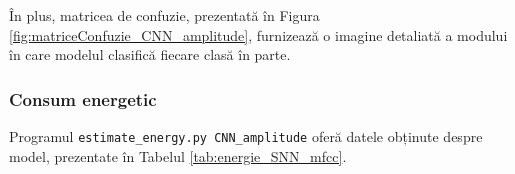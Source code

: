 În plus, matricea de confuzie, prezentată în Figura \ref{fig:matriceConfuzie_CNN_amplitude}, furnizează o imagine detaliată a modului în care modelul clasifică fiecare clasă în parte.


\subsubsection{Consum energetic}

Programul \texttt{estimate\_energy.py CNN\_amplitude} oferă datele obținute despre model, prezentate în Tabelul \ref{tab:energie_SNN_mfcc}.

\begin{table}[htbp]
    \centering
    \caption{Consumul energetic al rețelei neurale convoluționale antrenată cu amplitudinile semnalului audio}
    \label{tab:energie_CNN_amplitude}
\end{table}

